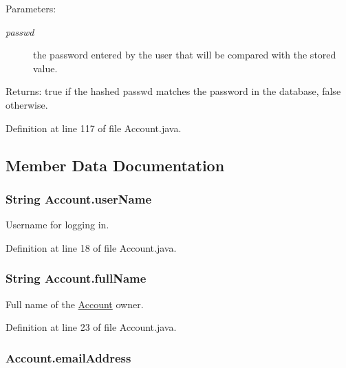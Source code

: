 \begin{Desc}
\item[Parameters:]
\begin{description}
\item[{\em passwd}]the password entered by the user that will be compared with the stored value. \end{description}
\end{Desc}
\begin{Desc}
\item[Returns:]true if the hashed passwd matches the password in the database, false otherwise. \end{Desc}


Definition at line 117 of file Account.java.

\subsection{Member Data Documentation}
\hypertarget{classAccount_82e5741dc469c95deab81dc6cca7736a}{
\subsubsection{\setlength{\rightskip}{0pt plus 5cm}String {\bf Account.userName}}}
\label{classAccount_82e5741dc469c95deab81dc6cca7736a}


Username for logging in. 



Definition at line 18 of file Account.java.\hypertarget{classAccount_0b789f8d14a1938803f8ff2d4f2d8b5e}{
\subsubsection{\setlength{\rightskip}{0pt plus 5cm}String {\bf Account.fullName}}}
\label{classAccount_0b789f8d14a1938803f8ff2d4f2d8b5e}


Full name of the \hyperlink{classAccount}{Account} owner. 



Definition at line 23 of file Account.java.\hypertarget{classAccount_4e5039ce78a405ba13acd79da0e16c7f}{
\subsubsection{ {\bf Account.emailAddress}}}
\label{classAccount_4e5039ce78a405ba13acd79da0e16c7f}



